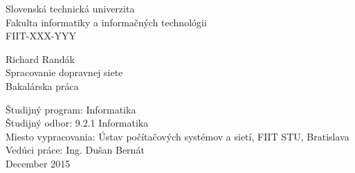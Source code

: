 \documentclass[12pt,twoside,slovak,a4paper]{article}
\begin{document}
\pagestyle{empty}

\begin{titlepage}
    \begin{center}
                 
        \LARGE{Slovenská technická univerzita} \\
        \LARGE{Fakulta informatiky a informačných technológii} \\      
        \Large{FIIT-XXX-YYY}
                
        \vspace{7cm}
        \Large{Richard Randák} \\ 
        \vspace{0.25cm}
        \huge{Spracovanie dopravnej siete}\\
        \vspace{0.25cm}
        \Large{Bakalárska práca} \vspace{0.25cm}
        
        
        \vfill    
            
    \end{center}
    \large
    Študijný program: Informatika\\
    Študijný odbor: 9.2.1 Informatika\\
    Miesto vypracovania: Ústav počítačových systémov a sietí, FIIT STU, Bratislava \\
    Vedúci práce: Ing. Dušan Bernát\\
    December 2015
    
\end{titlepage}
\end{document}
